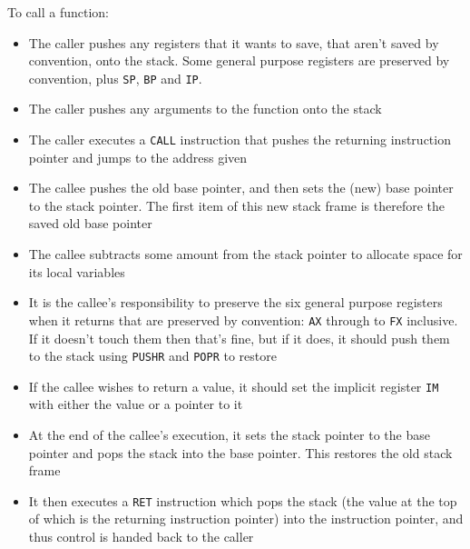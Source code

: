\documentclass[12pt,a4paper]{report}
\begin{document}
To call a function:
\begin{itemize}
  \item The caller pushes any registers that it wants to save, that aren't saved by convention, onto the stack. Some general purpose registers are preserved by convention, plus \texttt{SP}, \texttt{BP} and \texttt{IP}.
  \item The caller pushes any arguments to the function onto the stack
  \item The caller executes a \texttt{CALL} instruction that pushes the returning instruction pointer and jumps to the address given
  \item The callee pushes the old base pointer, and then sets the (new) base pointer to the stack pointer. The first item of this new stack frame is therefore the saved old base pointer
  \item The callee subtracts some amount from the stack pointer to allocate space for its local variables
  \item It is the callee's responsibility to preserve the six general purpose registers when it returns that are preserved by convention: \texttt{AX} through to \texttt{FX} inclusive. If it doesn't touch them then that's fine, but if it does, it should push them to the stack using \texttt{PUSHR} and \texttt{POPR} to restore
  \item If the callee wishes to return a value, it should set the implicit register \texttt{IM} with either the value or a pointer to it
  \item At the end of the callee's execution, it sets the stack pointer to the base pointer and pops the stack into the base pointer. This restores the old stack frame
  \item It then executes a \texttt{RET} instruction which pops the stack (the value at the top of which is the returning instruction pointer) into the instruction pointer, and thus control is handed back to the caller
\end{itemize}
\end{document}
